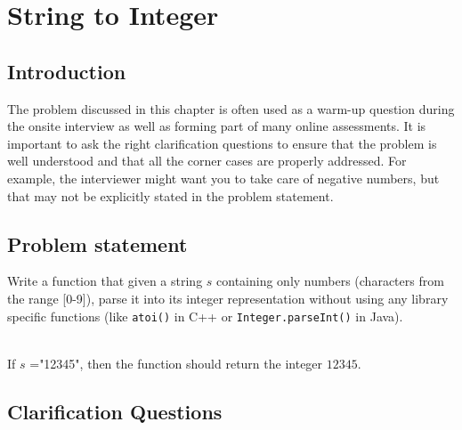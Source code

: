%

\chapter{String to Integer}
\label{ch:string_to_int}
\section*{Introduction}
The problem discussed in this chapter is often used as a warm-up question during the onsite interview as well as forming part of many online assessments. It is important to ask the right clarification questions to ensure that the problem is well  understood and that all the corner cases are properly addressed. For example,  the interviewer might want you to take care of negative numbers, but that may not be explicitly stated in the problem statement.

\section{Problem statement}
\begin{exercise}
Write a function that given a string $s$ containing only numbers (characters from the range [0-9]), parse it into its integer representation without using any library specific functions (like \texttt{atoi()} in C++ or  \texttt{Integer.parseInt()} in Java).
\end{exercise}


\begin{example}
	\hfill \\
	If $s$ ="12345", then the function should return the integer $12345$.	
\end{example}


\section{Clarification Questions}

